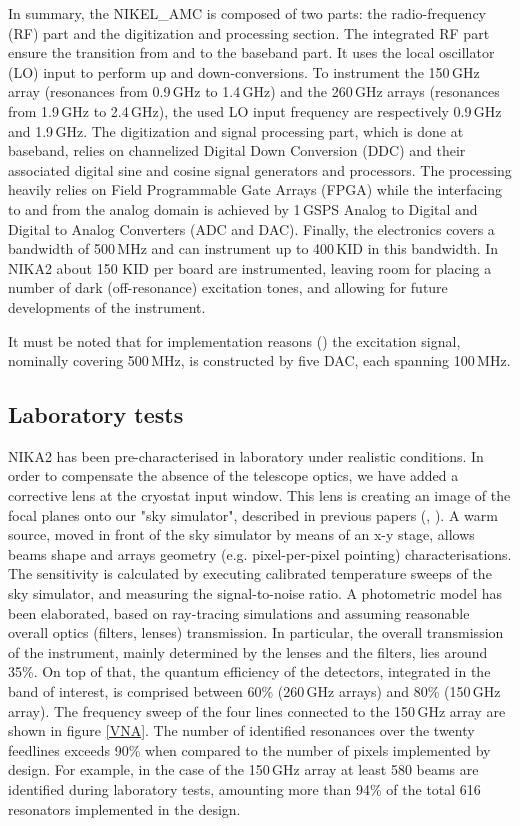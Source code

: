 \documentclass[]{aa} %
\begin{document}
In summary, the NIKEL\_AMC is composed of two parts: the radio-frequency (RF) part and the digitization and processing section.
The integrated RF part ensure the transition from and to the baseband part.
It uses the local oscillator (LO) input to perform up and down-conversions.
To instrument the 150\,GHz array (resonances from 0.9\,GHz to 1.4\,GHz) and the 260\,GHz arrays (resonances from 1.9\,GHz to 2.4\,GHz), the used LO input frequency are respectively 0.9\,GHz and 1.9\,GHz. The digitization and signal processing part, which is done at baseband, relies on channelized Digital Down Conversion (DDC) and their associated digital sine and cosine signal generators and processors.
The processing heavily relies on Field Programmable Gate Arrays (FPGA) while the interfacing to and from the analog domain is achieved by 1\,GSPS Analog to Digital and Digital to Analog Converters (ADC and DAC).
Finally, the electronics covers a bandwidth of 500\,MHz and can instrument up to 400\,KID in this bandwidth. In NIKA2 about 150 KID per board are instrumented, leaving room for placing a number of dark (off-resonance) excitation tones, and allowing for future developments of the instrument. 

It must be noted that for implementation reasons (\cite{Bourrion2012,Bourrion2016}) the excitation signal, nominally covering 500\,MHz, is constructed by five DAC, each spanning 100\,MHz.



\subsection{Laboratory tests}
\label{Laboratory tests}

NIKA2 has been pre-characterised in laboratory under realistic conditions. In order to compensate the absence of the telescope optics, we have added a corrective lens at the cryostat input window. This lens is creating an image of the focal planes onto our "sky simulator", described in previous papers (\cite{Catalano2014}, \cite{Monfardini2011}). A warm source, moved in front of the sky simulator by means of an x-y stage, allows beams shape and arrays geometry (e.g. pixel-per-pixel pointing) characterisations. The sensitivity is calculated by executing calibrated temperature sweeps of the sky simulator, and measuring the signal-to-noise ratio. A photometric model has been elaborated, based on ray-tracing simulations and assuming reasonable overall optics (filters, lenses) transmission. In particular, the overall transmission of the instrument, mainly determined by the lenses and the filters, lies around 35\%. On top of that, the quantum efficiency of the detectors, integrated in the band of interest, is comprised between 60\% (260\,GHz arrays) and 80\% (150\,GHz array). The frequency sweep of the four lines connected to the 150\,GHz array are shown in figure \ref{VNA}. The number of identified resonances over the twenty feedlines exceeds 90\% when compared to the number of pixels implemented by design. For example, in the case of the 150\,GHz array at least 580 beams are identified during laboratory tests, amounting more than 94\% of the total 616 resonators implemented in the design. 
\end{document}
